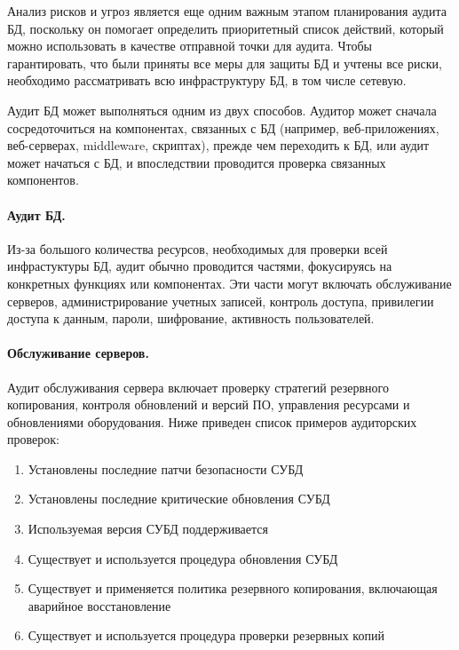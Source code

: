 Анализ рисков и угроз является еще одним важным этапом планирования аудита БД, поскольку он помогает определить приоритетный список действий, который можно использовать в качестве отправной точки для аудита. Чтобы гарантировать, что были приняты все меры для защиты БД и учтены все риски, необходимо рассматривать всю инфраструктуру БД, в том числе сетевую.

Аудит БД может выполняться одним из двух способов. Аудитор может сначала сосредоточиться на компонентах, связанных с БД (например, веб-приложениях, веб-серверах, middleware, скриптах), прежде чем переходить к БД, или аудит может начаться с БД, и впоследствии проводится проверка связанных компонентов.

\paragraph{Аудит БД.}

Из-за большого количества ресурсов, необходимых для проверки всей инфрастуктуры БД, аудит обычно проводится частями, фокусируясь на конкретных функциях или компонентах. Эти части могут включать обслуживание серверов, администрирование учетных записей, контроль доступа, привилегии доступа к данным, пароли, шифрование, активность пользователей.

\paragraph{Обслуживание серверов.}

Аудит обслуживания сервера включает проверку стратегий резервного копирования, контроля обновлений и версий ПО, управления ресурсами и обновлениями оборудования. Ниже приведен список примеров аудиторских проверок:

\begin{enumerate}
	\item Установлены последние патчи безопасности СУБД
	\item Установлены последние критические обновления СУБД
	\item Используемая версия СУБД поддерживается
	\item Существует и используется процедура обновления СУБД
	\item Существует и применяется политика резервного копирования, включающая аварийное восстановление
	\item Существует и используется процедура проверки резервных копий
\end{enumerate}

